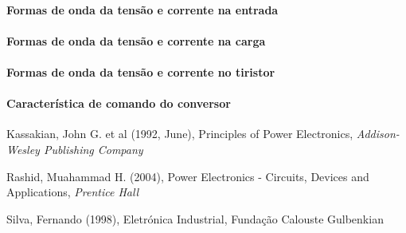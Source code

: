 \documentclass[a4paper,11pt]{article}
\numberwithin{equation}{section}
\begin{document}
\paragraph{Formas de onda da tensão e corrente na entrada}

\paragraph{Formas de onda da tensão e corrente na carga}

\paragraph{Formas de onda da tensão e corrente no tiristor}

\paragraph{Característica de comando do conversor}






\pagebreak

\begin{thebibliography}{2}
	
	Kassakian, John G. et al (1992, June), Principles of Power Electronics, \textit{Addison-Wesley Publishing Company}

	Rashid, Muahammad H. (2004), Power Electronics - Circuits, Devices and Applications, \textit{Prentice Hall}
	
	Silva, Fernando (1998), Eletrónica Industrial, Fundação Calouste Gulbenkian
	
\end{thebibliography}


\pagebreak
\end{document}
